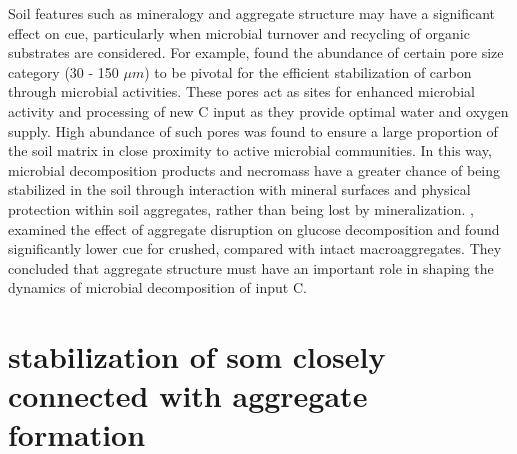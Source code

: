	Soil features such as mineralogy and aggregate structure may have a significant effect on \gls{cue}, particularly when microbial turnover and recycling of organic substrates are considered. For example, \citet{kravchenko2019} found the abundance of certain pore size category (30 - 150 $ \mu m $) to be pivotal for the efficient stabilization of carbon through microbial activities. These pores act as sites for enhanced microbial activity and processing of new C input as they provide optimal water and oxygen supply. High abundance of such pores was found to ensure a large proportion of the soil matrix in close proximity to active microbial communities. In this way, microbial decomposition products and necromass have a greater chance of being stabilized in the soil through interaction with mineral surfaces and physical protection within soil aggregates, rather than being lost by mineralization.
	\citet{tian2015}, examined the effect of aggregate disruption on glucose decomposition and found significantly lower \gls{cue} for crushed, compared with intact macroaggregates. They concluded that aggregate structure must have an important role in shaping the dynamics of microbial decomposition of input C.

\section{stabilization of \gls{som} closely connected with aggregate formation}

